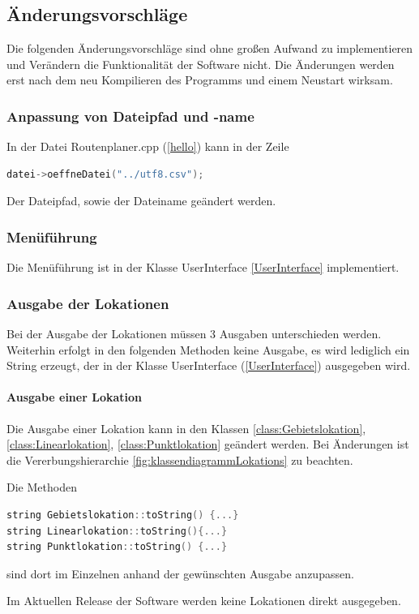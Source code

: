 \documentclass[12pt, a4paper, ngerman]{article}
\begin{document}
\subsection{Änderungsvorschläge}
Die folgenden Änderungsvorschläge sind ohne großen Aufwand zu implementieren und Verändern die Funktionalität der Software nicht. Die  Änderungen werden erst nach dem neu Kompilieren des Programms und einem Neustart wirksam. 

\subsubsection{Anpassung von Dateipfad und -name}
In der Datei Routenplaner.cpp (\ref{hello}) kann in der Zeile 
\begin{lstlisting}[language=C++]
datei->oeffneDatei("../utf8.csv");
\end{lstlisting}
Der Dateipfad, sowie der Dateiname geändert werden.

\subsubsection{Menüführung}
Die Menüführung ist in der Klasse UserInterface \ref{UserInterface} implementiert. 

\subsubsection{Ausgabe der Lokationen}
Bei der Ausgabe der Lokationen müssen 3 Ausgaben unterschieden werden. Weiterhin erfolgt in den folgenden Methoden keine Ausgabe, es wird lediglich ein String erzeugt, der in der Klasse UserInterface (\ref{UserInterface}) ausgegeben wird.
\paragraph{Ausgabe einer Lokation}
Die Ausgabe einer Lokation kann in den Klassen \ref{class:Gebietslokation}, \ref{class:Linearlokation}, \ref{class:Punktlokation} geändert werden. Bei Änderungen ist die Vererbungshierarchie \ref{fig:klassendiagrammLokations} zu beachten. 

Die Methoden 
\begin{lstlisting}[language=C++]
string Gebietslokation::toString() {...}
string Linearlokation::toString(){...}
string Punktlokation::toString() {...}
\end{lstlisting}
sind dort im Einzelnen anhand der gewünschten Ausgabe anzupassen.

Im Aktuellen Release der Software werden keine Lokationen direkt ausgegeben. 
\end{document}
